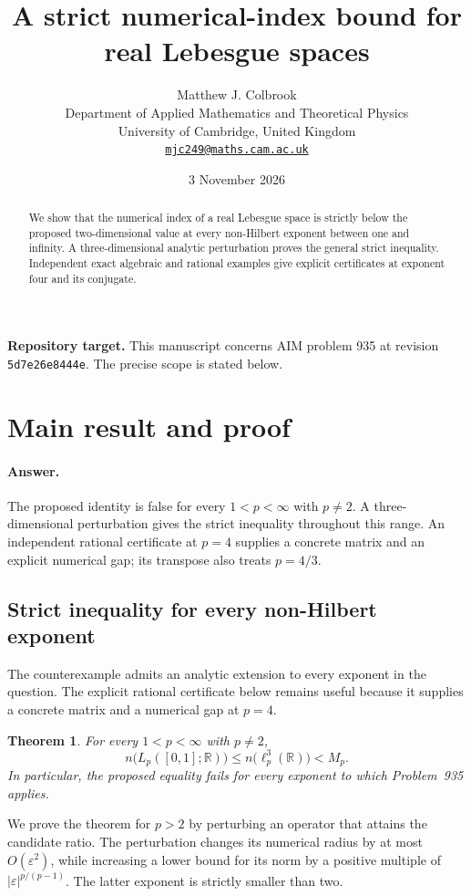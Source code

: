 \documentclass[11pt,a4paper]{article}
\title{\textbf{A strict numerical-index bound for real Lebesgue spaces}}
\author{Matthew J. Colbrook\\[3pt]
{\small Department of Applied Mathematics and Theoretical Physics}\\
{\small University of Cambridge, United Kingdom}\\
{\small\href{mailto:mjc249@maths.cam.ac.uk}{\texttt{mjc249@maths.cam.ac.uk}}}}
\date{3 November 2026}
\newtheorem{theorem}{Theorem}[section]
\theoremstyle{remark}
\begin{document}
\maketitle
\begin{abstract}
We show that the numerical index of a real Lebesgue space is strictly below the proposed two-dimensional value at every non-Hilbert exponent between one and infinity. A three-dimensional analytic perturbation proves the general strict inequality. Independent exact algebraic and rational examples give explicit certificates at exponent four and its conjugate.
\end{abstract}
\noindent\textbf{Repository target.}
This manuscript concerns AIM problem 935 at revision
\texttt{5d7e26e8444e}. The precise scope is stated below.
\medskip

\section{Main result and proof}
\label{sec:935}

\paragraph{Answer.} The proposed identity is false for every
$1<p<\infty$ with $p\ne2$. A three-dimensional perturbation gives the
strict inequality throughout this range. An independent rational
certificate at $p=4$ supplies a concrete matrix and an explicit numerical
gap; its transpose also treats $p=4/3$.

\subsection{Strict inequality for every non-Hilbert exponent}
\label{sec:935-general}

The counterexample admits an analytic extension to every exponent in the
question. The explicit rational certificate below remains useful because
it supplies a concrete matrix and a numerical gap at $p=4$.

\begin{theorem}\label{thm:935-allp}
For every $1<p<\infty$ with $p\ne2$,
\[
 n\bigl(L_p([0,1];\mathbb R)\bigr)
 \le n\bigl(\ell_p^3(\mathbb R)\bigr)<M_p.
\]
In particular, the proposed equality fails for every exponent to which
Problem~935 applies.
\end{theorem}

We prove the theorem for $p>2$ by perturbing an operator that attains the
candidate ratio. The perturbation changes its numerical radius by at most
$O(\varepsilon^2)$, while increasing a lower bound for its norm by a
positive multiple of $|\varepsilon|^{p/(p-1)}$. The latter exponent is
strictly smaller than two.
\end{document}
